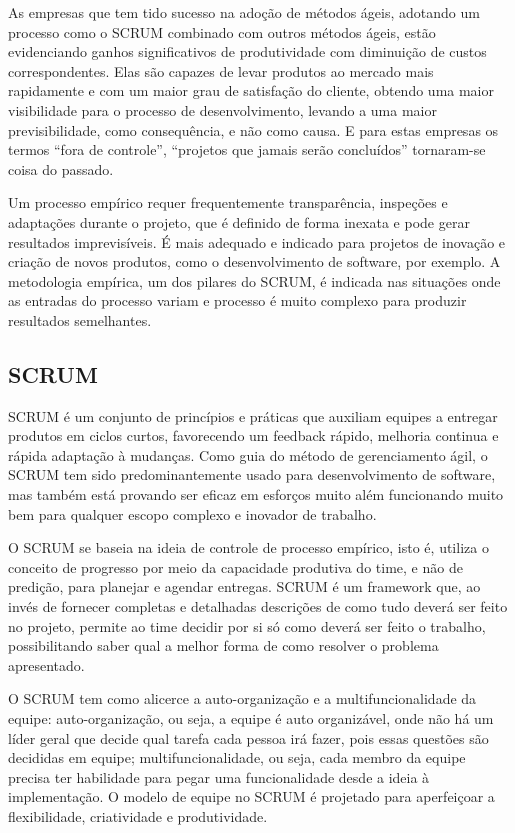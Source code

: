 As empresas que tem tido sucesso na adoção de métodos ágeis, adotando um processo como o SCRUM combinado com outros métodos ágeis, estão evidenciando ganhos significativos de produtividade com diminuição de custos correspondentes. Elas são capazes de levar produtos ao mercado mais rapidamente e com um maior grau de satisfação do cliente, obtendo uma maior visibilidade para o processo de desenvolvimento, levando a uma maior previsibilidade, como consequência, e não como causa. E para estas empresas os termos “fora de controle”, “projetos que jamais serão concluídos” tornaram-se coisa do passado. \cite{cohn2010}

Um processo empírico requer frequentemente transparência, inspeções e adaptações durante o projeto, que é definido de forma inexata e pode gerar resultados imprevisíveis. É mais adequado e indicado para projetos de inovação e criação de novos produtos, como o desenvolvimento de software, por exemplo. A metodologia empírica, um dos pilares do SCRUM, é indicada nas situações onde as entradas do processo variam e processo é muito complexo para produzir resultados semelhantes. \cite{martins2007}

\subsection{SCRUM}
SCRUM é um conjunto de princípios e práticas que auxiliam equipes a entregar produtos em ciclos curtos, favorecendo um feedback rápido, melhoria continua e rápida adaptação à mudanças. Como guia do método de gerenciamento ágil, o SCRUM tem sido predominantemente usado para desenvolvimento de software, mas também está provando ser eficaz em esforços muito além funcionando muito bem para qualquer escopo complexo e inovador de trabalho. \cite{scrumalliance}

O SCRUM se baseia na ideia de controle de processo empírico, isto é, utiliza o conceito de progresso por meio da capacidade produtiva do time, e não de predição, para planejar e agendar entregas. SCRUM é um framework que, ao invés de fornecer completas e detalhadas descrições de como tudo deverá ser feito no projeto, permite ao time decidir por si só como deverá ser feito o trabalho, possibilitando saber qual a melhor forma de como resolver o problema apresentado. \cite{scrummethodology}

O SCRUM tem como alicerce a auto-organização e a multifuncionalidade da equipe: auto-organização, ou seja, a equipe é auto organizável, onde não há um líder geral que decide qual tarefa cada pessoa irá fazer, pois essas questões são decididas em equipe; multifuncionalidade, ou seja, cada membro da equipe precisa ter habilidade para pegar uma funcionalidade desde a ideia à implementação. \cite{mountaingoat}
O modelo de equipe no SCRUM é projetado para aperfeiçoar a flexibilidade, criatividade e produtividade. \cite{scrumguide}

